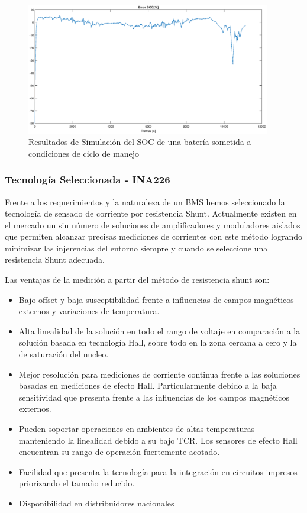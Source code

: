 \documentclass[10pt,a4paper]{article}
\begin{document}
\begin{figure}[h!]
    \begin{center}
	\includegraphics[width=0.95\textwidth]{soc_error_porc.eps}
	\caption{Resultados de Simulación del SOC de una batería sometida a
	condiciones de ciclo de manejo}
	\label{error_SOC_Sim}
    \end{center}
\end{figure}
\FloatBarrier

\subsubsection{Tecnología Seleccionada - INA226}

Frente a los requerimientos y la naturaleza de un \acrshort{BMS} hemos
seleccionado la tecnología de sensado de corriente por resistencia Shunt.
Actualmente existen en el mercado un sin número de soluciones de amplificadores
y moduladores aislados que permiten alcanzar precisas mediciones de corrientes
con este método logrando minimizar las injerencias del entorno siempre y cuando
se seleccione una resistencia Shunt adecuada.

\noindent Las ventajas de la medición a partir del método de resistencia 
shunt son:

\begin{itemize}
    \item Bajo offset y baja susceptibilidad frente a influencias de campos 
	magnéticos externos y variaciones de temperatura.
    \item Alta linealidad de la solución en todo el rango de voltaje en 
	comparación a la solución basada en tecnología Hall, sobre todo en 
	la zona cercana a cero y la de saturación del nucleo. 
    \item Mejor resolución para mediciones de corriente continua frente a 
	las soluciones basadas en mediciones de efecto Hall. 
	Particularmente debido a la baja sensitividad que presenta frente a 
	las influencias de los campos magnéticos externos.
    \item Pueden soportar operaciones en ambientes de altas temperaturas 
	manteniendo la linealidad debido a su bajo TCR. 
	Los sensores de efecto Hall encuentran su rango de operación 
	fuertemente acotado.
    \item Facilidad que presenta la tecnología para la integración en 
	circuitos impresos priorizando el tamaño reducido.
    \item Disponibilidad en distribuidores nacionales
\end{itemize}
\end{document}
